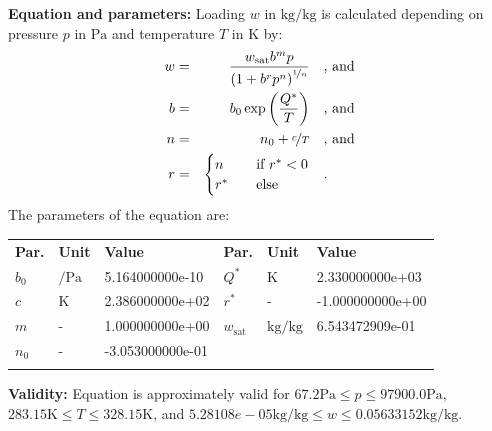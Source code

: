 \textbf{Equation and parameters:}
\newline
%
Loading $w$ in $\si{\kilogram\per\kilogram}$ is calculated depending on pressure $p$ in $\si{\pascal}$ and temperature $T$ in $\si{\kelvin}$ by:
%
\begin{equation*}
\begin{split}
w &=& \frac{w_\mathrm{sat} b^{m} p}{\left( 1 + b^{r} p^{n} \right)^{\nicefrac{1}{n}}} & \quad\text{, and} \\
b &=& b_0 \exp\left( \frac{Q^{*}}{T} \right) & \quad\text{, and} \\
n &=& n_0 + \nicefrac{c}{T} & \quad\text{, and} \\
r &=& \begin{cases} n & \quad \text{if } r^{*} < 0 \\ r^{*}  & \quad \text{else} \end{cases} & \quad\text{.}
\end{split}
\end{equation*}
%
The parameters of the equation are:
%
\begin{longtable}[l]{lll|lll}
\toprule
\addlinespace
\textbf{Par.} & \textbf{Unit} & \textbf{Value} &	\textbf{Par.} & \textbf{Unit} & \textbf{Value} \\
\addlinespace
\midrule
\endhead

\bottomrule
\endfoot
\bottomrule
\endlastfoot
\addlinespace

$b_0$ & $\si{\per\pascal}$ & 5.164000000e-10 & $Q^{*}$ & $\si{\kelvin}$ & 2.330000000e+03 \\
$c$ & $\si{\kelvin}$ & 2.386000000e+02 & $r^{*}$ & - & -1.000000000e+00 \\
$m$ & - & 1.000000000e+00 & $w_\mathrm{sat}$ & $\si{\kilogram\per\kilogram}$ & 6.543472909e-01 \\
$n_0$ & - & -3.053000000e-01 & & & \\

\addlinespace\end{longtable}

\textbf{Validity:}
\newline
Equation is approximately valid for $67.2 \si{\pascal} \leq p \leq 97900.0 \si{\pascal}$,  $283.15 \si{\kelvin} \leq T \leq 328.15 \si{\kelvin}$, and $5.28108e-05 \si{\kilogram\per\kilogram} \leq w \leq 0.05633152 \si{\kilogram\per\kilogram}$.
\newline

